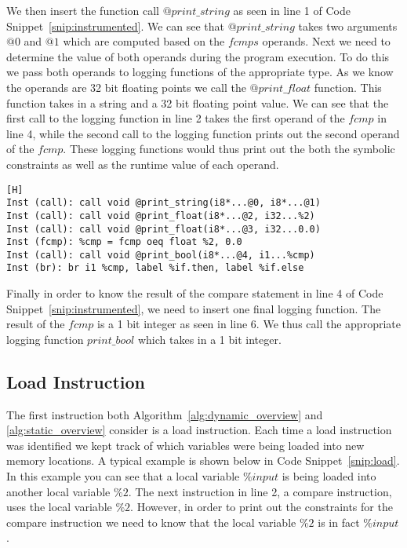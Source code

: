 We then insert the function call $@print\_string$ as seen in line 1 of Code Snippet~\ref{snip:instrumented}. We can see that $@print\_string$ takes two arguments $@0$ and $@1$ which are computed based on the $fcmps$ operands. Next we need to determine the value of both operands during the program execution. To do this we pass both operands to logging functions of the appropriate type. As we know the operands are 32 bit floating points we call the $@print\_float$ function. This function takes in a string and a 32 bit floating point value. We can see that the first call to the logging function in line 2 takes the first operand of the $fcmp$ in line 4, while the second call to the logging function prints out the second operand of the $fcmp$. These logging functions would thus print out the both the symbolic constraints as well as the runtime value of each operand.


\vspace{-0.4cm}

\begin{lstlisting}[caption={New Equivalent Instrumented Code}, label=snip:instrumented][H]
Inst (call): call void @print_string(i8*...@0, i8*...@1)
Inst (call): call void @print_float(i8*...@2, i32...%2)
Inst (call): call void @print_float(i8*...@3, i32...0.0)
Inst (fcmp): %cmp = fcmp oeq float %2, 0.0
Inst (call): call void @print_bool(i8*...@4, i1...%cmp)
Inst (br): br i1 %cmp, label %if.then, label %if.else
\end{lstlisting}

Finally in order to know the result of the compare statement in line 4 of Code Snippet~\ref{snip:instrumented}, we need to insert one final logging function. The result of the $fcmp$ is a 1 bit integer as seen in line 6. We thus call the appropriate logging function $print\_bool$ which takes in a 1 bit integer.

\subsection{Load Instruction}

The first instruction both Algorithm~\ref{alg:dynamic_overview} and \ref{alg:static_overview} consider is a load instruction\cite{loadinstruction}. Each time a load instruction was identified we kept track of which variables were being loaded into new memory locations. A typical example is shown below in Code Snippet~\ref{snip:load}. In this example you can see that a local variable $\%input$ is being loaded into another local variable $\%2$. The next instruction in line 2, a compare instruction, uses the local variable $\%2$. However, in order to print out the constraints for the compare instruction we need to know that the local variable $\%2$ is in fact $\%input$.

